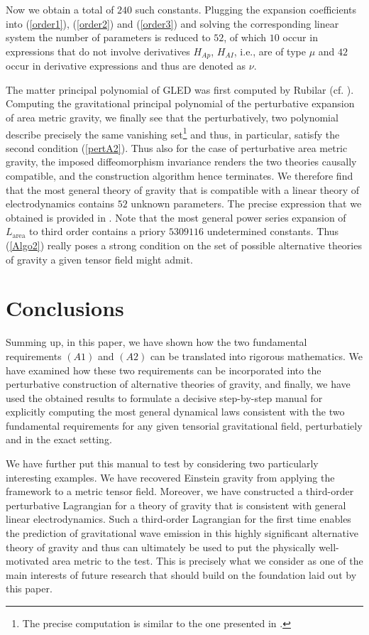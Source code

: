 \documentclass[%
 reprint,
nofootinbib,
 amsmath,amssymb,
 aps,
 prd,
floatfix,
]{revtex4-2}
\begin{document}
Now we obtain a total of $240$ such constants. Plugging the expansion coefficients into (\ref{order1}), (\ref{order2}) and (\ref{order3}) and solving the corresponding linear system the number of parameters is reduced to $52$, of which $10$ occur in expressions that do not involve derivatives $H_{Ap}$, $H_{AI}$, i.e., are of type $\mu$ and $42$ occur in derivative expressions and thus are denoted as $\nu$.

The matter principal polynomial of GLED was first computed by Rubilar (cf. \cite{2009JPhA...42U5402I}).
Computing the gravitational principal polynomial of the perturbative expansion of area metric gravity, we finally see that the perturbatively, two polynomial describe precisely the same vanishing set\footnote{The precise computation is similar to the one presented in \cite{TobiR}.} and thus, in particular, satisfy the second condition (\ref{pertA2}). 
Thus also for the case of perturbative area metric gravity, the imposed diffeomorphism invariance renders the two theories causally compatible, and the construction algorithm hence terminates. 
We therefore find that the most general theory of gravity that is compatible with a linear theory of electrodynamics contains $52$ unknown parameters. The precise expression that we obtained is provided in \cite{TobiMaster}.
Note that the most general power series expansion of $L_{\text{area}}$ to third order contains a priory $5309116$ undetermined constants. Thus (\ref{Algo2}) really poses a strong condition on the set of possible alternative theories of gravity a given tensor field might admit. 
\section{Conclusions}
Summing up, in this paper, we have shown how the two fundamental requirements $(A1)$ and $(A2)$ can be translated into rigorous mathematics. We have examined how these two requirements can be incorporated into the perturbative construction of alternative theories of gravity, and finally, we have used the obtained results to formulate a decisive step-by-step manual for explicitly computing the most general dynamical laws consistent with the two fundamental requirements for any given tensorial gravitational field, perturbatiely and in the exact setting.  

We have further put this manual to test by considering two particularly interesting examples. We have recovered Einstein gravity from applying the framework to a metric tensor field. Moreover, we have constructed a third-order perturbative Lagrangian for a theory of gravity that is consistent with general linear electrodynamics. Such a third-order Lagrangian for the first time enables the prediction of gravitational wave emission in this highly significant alternative theory of gravity and thus can ultimately be used to put the physically well-motivated area metric to the test. This is precisely what we consider as one of the main interests of future research that should build on the foundation laid out by this paper.  



\end{document}

